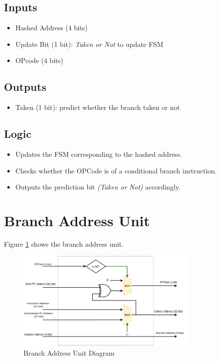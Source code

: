 \subsection{Inputs}
\begin{itemize}
    \item Hashed Address (4 bits)
    \item Update Bit (1 bit): \emph{Taken or Not}  to update FSM
    \item OPcode (4 bits)
\end{itemize}

\subsection{Outputs}
\begin{itemize}
    \item Taken (1 bit): predict whether the branch taken or not
\end{itemize}

\subsection{Logic}
\begin{itemize}
    \item Updates the FSM corresponding to the hashed address.
    \item Checks whether the OPCode is of a conditional branch instruction.
    \item Outputs the prediction bit \emph{(Taken or Not)} accordingly.
\end{itemize}

\section{Branch Address Unit}
Figure \ref{fig:bau} shows the branch address unit.
\begin{figure}[hp]
    \centering
    \includegraphics[width=0.8\textwidth]{images/bau.png}
    \caption{Branch Address Unit Diagram}
    \label{fig:bau}
\end{figure}

